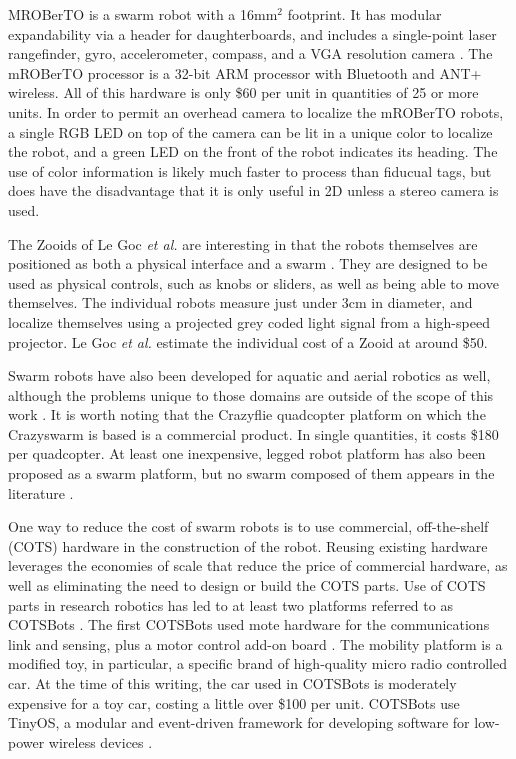 MROBerTO is a swarm robot with a 16mm$^2$ footprint. It has modular expandability via a header for daughterboards, and includes a single-point laser rangefinder, gyro, accelerometer, compass, and a VGA resolution camera \citep{Kim2016mROBerTOAM}. 
The mROBerTO processor is a 32-bit ARM processor with Bluetooth and ANT+ wireless. 
All of this hardware is only \$60 per unit in quantities of 25 or more units. 
In order to permit an overhead camera to localize the mROBerTO robots, a single RGB LED on top of the camera can be lit in a unique color to localize the robot, and a green LED on the front of the robot indicates its heading. 
The use of color information is likely much faster to process than fiducual tags, but does have the disadvantage that it is only useful in 2D unless a stereo camera is used. 

The Zooids of Le Goc \emph{et al.} are interesting in that the robots themselves are positioned as both a physical interface and a swarm \citep{le2016zooids}. 
They are designed to be used as physical controls, such as knobs or sliders, as well as being able to move themselves.
The individual robots measure just under 3cm in diameter, and localize themselves using a projected grey coded light signal from a high-speed projector. 
Le Goc \emph{et al.} estimate the individual cost of a Zooid at around \$50. 

Swarm robots have also been developed for aquatic and aerial robotics as well, although the problems unique to those domains are outside of the scope of this work \citep{costa2016design, preiss2017crazyswarm}. 
It is worth noting that the Crazyflie quadcopter platform on which the Crazyswarm is based is a commercial product. 
In single quantities, it costs \$180 per quadcopter. 
At least one inexpensive, legged robot platform has also been proposed as a swarm platform, but no swarm composed of them appears in the literature \citep{kalat2015tribot}. 

One way to reduce the cost of swarm robots is to use commercial, off-the-shelf (COTS) hardware in the construction of the robot. 
Reusing existing hardware leverages the economies of scale that reduce the price of commercial hardware, as well as eliminating the need to design or build the COTS parts. 
Use of COTS parts in research robotics has led to at least two platforms referred to as COTSBots \citep{bergbreiter2003cotsbots, soule2011cotsbots}.
The first COTSBots used mote hardware for the communications link and sensing, plus a motor control add-on board \citep{bergbreiter2003cotsbots}. 
The mobility platform is a modified toy, in particular, a specific brand of high-quality micro radio controlled car.
At the time of this writing, the car used in COTSBots is moderately expensive for a toy car, costing a little over \$100 per unit. 
COTSBots use TinyOS, a modular and event-driven framework for developing software for low-power wireless devices \citep{levis2005tinyos}. 


